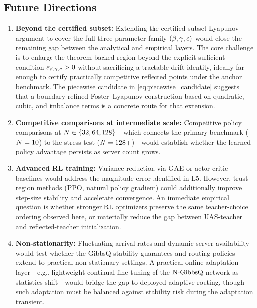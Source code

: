 \subsection{Future Directions}

\begin{enumerate}[label=\textbf{F\arabic*.}, leftmargin=2.2em]
\item \textbf{Beyond the certified subset:}
Extending the certified-subset Lyapunov argument to cover the full three-parameter family $(\beta, \gamma, c)$ would close the remaining gap between the analytical and empirical layers.
The core challenge is to enlarge the theorem-backed region beyond the explicit sufficient condition $\varepsilon_{\beta,\gamma,c}>0$ without sacrificing a tractable drift identity, ideally far enough to certify practically competitive reflected points under the anchor benchmark.
The piecewise candidate in \cref{eq:piecewise_candidate} suggests that a boundary-refined Foster--Lyapunov construction based on quadratic, cubic, and imbalance terms is a concrete route for that extension.

\item \textbf{Competitive comparisons at intermediate scale:}
Competitive policy comparisons at $N \in \{32, 64, 128\}$---which connects the primary benchmark ($N = 10$) to the stress test ($N = 128{+}$)---would establish whether the learned-policy advantage persists as server count grows.

\item \textbf{Advanced RL training:}
Variance reduction via GAE or actor-critic baselines would address the \reinforce{} magnitude error identified in L5.
However, trust-region methods (PPO, natural policy gradient) could additionally improve step-size stability and accelerate convergence.
An immediate empirical question is whether stronger RL optimizers preserve the same teacher-choice ordering observed here, or materially reduce the gap between UAS-teacher and reflected-teacher initialization.

\item \textbf{Non-stationarity:}
Fluctuating arrival rates and dynamic server availability would test whether the GibbsQ stability guarantees and routing policies extend to practical non-stationary settings. A practical online adaptation layer---e.g., lightweight continual fine-tuning of the $\text{N-GibbsQ}$ network as statistics shift---would bridge the gap to deployed adaptive routing, though such adaptation must be balanced against stability risk during the adaptation transient.


\end{enumerate}
